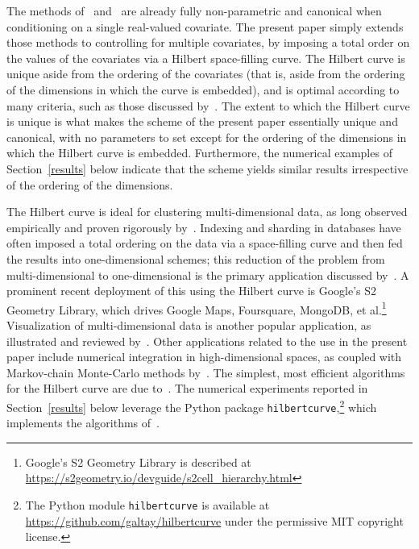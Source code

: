 \documentclass{article}
\begin{document}
The methods of~\cite{tygert_full} and~\cite{tygert_two}
are already fully non-parametric and canonical when conditioning
on a single real-valued covariate.
The present paper simply extends those methods to controlling
for multiple covariates, by imposing a total order
on the values of the covariates via a Hilbert space-filling curve.
The Hilbert curve is unique aside from the ordering of the covariates
(that is, aside from the ordering of the dimensions in which the curve
is embedded), and is optimal according to many criteria, such as those
discussed by~\cite{moon-jagadish-faloutsos-saltz}.
The extent to which the Hilbert curve is unique is what makes the scheme
of the present paper essentially unique and canonical, with no parameters
to set except for the ordering of the dimensions in which the Hilbert curve
is embedded.
Furthermore, the numerical examples of Section~\ref{results} below indicate
that the scheme yields similar results irrespective of the ordering
of the dimensions.

The Hilbert curve is ideal for clustering multi-dimensional data,
as long observed empirically and proven rigorously
by~\cite{moon-jagadish-faloutsos-saltz}.
Indexing and sharding in databases have often imposed a total ordering
on the data via a space-filling curve and then fed the results
into one-dimensional schemes; this reduction of the problem
from multi-dimensional to one-dimensional is the primary application
discussed by~\cite{moon-jagadish-faloutsos-saltz}.
A prominent recent deployment of this using the Hilbert curve
is Google's S2 Geometry Library, which drives Google Maps, Foursquare, MongoDB,
et al.\footnote{Google's S2 Geometry Library is described
at \url{https://s2geometry.io/devguide/s2cell_hierarchy.html}}
Visualization of multi-dimensional data is another popular application,
as illustrated and reviewed by~\cite{castro-burns}.
Other applications related to the use in the present paper
include numerical integration in high-dimensional spaces,
as coupled with Markov-chain Monte-Carlo methods by~\cite{skilling2}.
The simplest, most efficient algorithms for the Hilbert curve
are due to~\cite{skilling}. The numerical experiments reported
in Section~\ref{results} below leverage the Python package
{\tt hilbertcurve},\footnote{The Python module {\tt hilbertcurve}
is available at \url{https://github.com/galtay/hilbertcurve}
under the permissive MIT copyright license.}
which implements the algorithms of~\cite{skilling}.
\end{document}
